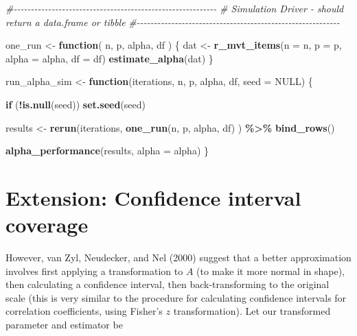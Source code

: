 \documentclass[
]{book}
\newenvironment{Shaded}{\begin{snugshade}}{\end{snugshade}}
\newcommand{\AttributeTok}[1]{\textcolor[rgb]{0.13,0.29,0.53}{#1}}
\newcommand{\CommentTok}[1]{\textcolor[rgb]{0.56,0.35,0.01}{\textit{#1}}}
\newcommand{\ConstantTok}[1]{\textcolor[rgb]{0.56,0.35,0.01}{#1}}
\newcommand{\ControlFlowTok}[1]{\textcolor[rgb]{0.13,0.29,0.53}{\textbf{#1}}}
\newcommand{\FunctionTok}[1]{\textcolor[rgb]{0.13,0.29,0.53}{\textbf{#1}}}
\newcommand{\NormalTok}[1]{#1}
\newcommand{\OtherTok}[1]{\textcolor[rgb]{0.56,0.35,0.01}{#1}}
\newcommand{\SpecialCharTok}[1]{\textcolor[rgb]{0.81,0.36,0.00}{\textbf{#1}}}
\begin{document}
\begin{Shaded}
\begin{Highlighting}[]
\CommentTok{\#{-}{-}{-}{-}{-}{-}{-}{-}{-}{-}{-}{-}{-}{-}{-}{-}{-}{-}{-}{-}{-}{-}{-}{-}{-}{-}{-}{-}{-}{-}{-}{-}{-}{-}{-}{-}{-}{-}{-}{-}{-}{-}{-}{-}{-}{-}{-}{-}{-}{-}{-}{-}{-}{-}{-}{-}{-}{-}{-}}
\CommentTok{\# Simulation Driver {-} should return a data.frame or tibble}
\CommentTok{\#{-}{-}{-}{-}{-}{-}{-}{-}{-}{-}{-}{-}{-}{-}{-}{-}{-}{-}{-}{-}{-}{-}{-}{-}{-}{-}{-}{-}{-}{-}{-}{-}{-}{-}{-}{-}{-}{-}{-}{-}{-}{-}{-}{-}{-}{-}{-}{-}{-}{-}{-}{-}{-}{-}{-}{-}{-}{-}{-}}


\NormalTok{one\_run }\OtherTok{\textless{}{-}} \ControlFlowTok{function}\NormalTok{( n, p, alpha, df ) \{}
\NormalTok{    dat }\OtherTok{\textless{}{-}} \FunctionTok{r\_mvt\_items}\NormalTok{(}\AttributeTok{n =}\NormalTok{ n, }\AttributeTok{p =}\NormalTok{ p, }\AttributeTok{alpha =}\NormalTok{ alpha, }\AttributeTok{df =}\NormalTok{ df)}
    \FunctionTok{estimate\_alpha}\NormalTok{(dat)}
\NormalTok{\}}


\NormalTok{run\_alpha\_sim }\OtherTok{\textless{}{-}} \ControlFlowTok{function}\NormalTok{(iterations, n, p, alpha, df, }\AttributeTok{seed =} \ConstantTok{NULL}\NormalTok{) \{}
  
  \ControlFlowTok{if}\NormalTok{ (}\SpecialCharTok{!}\FunctionTok{is.null}\NormalTok{(seed)) }\FunctionTok{set.seed}\NormalTok{(seed)}

\NormalTok{  results }\OtherTok{\textless{}{-}} 
    \FunctionTok{rerun}\NormalTok{(iterations, }\FunctionTok{one\_run}\NormalTok{(n, p, alpha, df) ) }\SpecialCharTok{\%\textgreater{}\%}
    \FunctionTok{bind\_rows}\NormalTok{()}
  
  \FunctionTok{alpha\_performance}\NormalTok{(results, }\AttributeTok{alpha =}\NormalTok{ alpha)}
\NormalTok{\}}
\end{Highlighting}
\end{Shaded}

\section{Extension: Confidence interval coverage}\label{extension-confidence-interval-coverage}

However, van Zyl, Neudecker, and Nel (2000) suggest that a better approximation involves first applying a transformation to \(A\) (to make it more normal in shape), then calculating a confidence interval, then back-transforming to the original scale (this is very similar to the procedure for calculating confidence intervals for correlation coefficients, using Fisher's \(z\) transformation). Let our transformed parameter and estimator be
\end{document}
